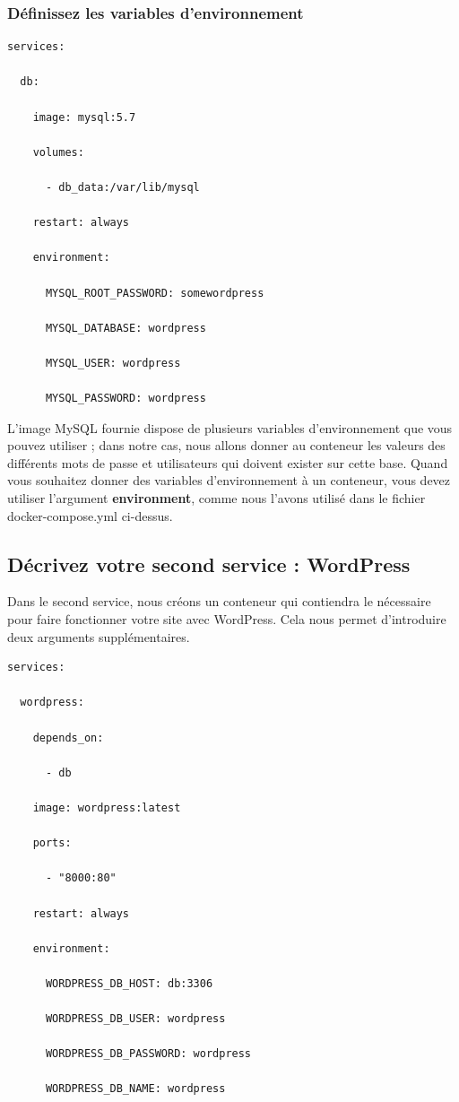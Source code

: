 \documentclass[12pt,a4paper]{article}
\begin{document}
\subsubsection{Définissez les variables d'environnement}
\begin{verbatim}
services:

  db:

    image: mysql:5.7

    volumes:

      - db_data:/var/lib/mysql

    restart: always

    environment:

      MYSQL_ROOT_PASSWORD: somewordpress

      MYSQL_DATABASE: wordpress

      MYSQL_USER: wordpress

      MYSQL_PASSWORD: wordpress
\end{verbatim}

L'image MySQL fournie dispose de plusieurs variables d'environnement que vous pouvez utiliser ; dans notre cas, nous allons donner au conteneur les valeurs des différents mots de passe et utilisateurs qui doivent exister sur cette base. Quand vous souhaitez donner des variables d'environnement à un conteneur, vous devez utiliser l'argument \textbf{environment}, comme nous l'avons utilisé dans le fichier docker-compose.yml ci-dessus.
\subsection{Décrivez votre second service : WordPress}
Dans le second service, nous créons un conteneur qui contiendra le nécessaire pour faire fonctionner votre site avec WordPress. Cela nous permet d'introduire deux arguments supplémentaires.

\begin{verbatim}
services:

  wordpress:

    depends_on:

      - db

    image: wordpress:latest

    ports:

      - "8000:80"

    restart: always

    environment:

      WORDPRESS_DB_HOST: db:3306

      WORDPRESS_DB_USER: wordpress

      WORDPRESS_DB_PASSWORD: wordpress

      WORDPRESS_DB_NAME: wordpress
\end{verbatim}
\end{document}
